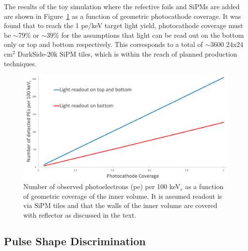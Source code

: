 \documentclass[a4paper,11pt]{article}
\begin{document}
The results of the toy simulation where the refective foils and SiPMs are added are shown in Figure~\ref{fig:pecoverage} as a function of geometric photocathode coverage. It was found that to reach the 1 pe/keV target light yield, photocathode coverage must be $\sim$79\% or $\sim$39\% for the assumptions that light can be read out on the bottom only or top and bottom respectively. This corresponds to a total of $\sim$3600 24x24 cm$^{2}$ DarkSide-20k SiPM tiles, which is within the reach of planned production techniques.

\begin{figure}[ht]
\begin{centering}
\includegraphics[width=0.90\columnwidth]{Figures/lightReadout_100520_new.png}
\par\end{centering}
\caption{Number of observed photoelectrons (pe) per 100 keV$_r$ as a function of geometric coverage of the inner volume. It is assumed readout is via SiPM tiles and that the walls of the inner volume are covered with reflector as discussed in the text. \label{fig:pecoverage}}
\end{figure}


\subsection{Pulse Shape Discrimination}\label{sec:psd_calc}
\end{document}

